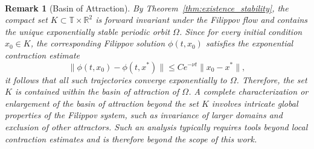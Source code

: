 \documentclass[11pt]{article}
\newtheorem{remark}{Remark}
\begin{document}
\

\begin{remark}[Basin of Attraction]\label{rem:basin_of_attraction}
By Theorem~\ref{thm:existence_stability}, the compact set \(K \subset \mathbb{T} \times \mathbb{R}^2\) is forward invariant under the Filippov flow and contains the unique exponentially stable periodic orbit \(\Omega\). Since for every initial condition \(x_0 \in K\), the corresponding Filippov solution \(\phi(t, x_0)\) satisfies the exponential contraction estimate
	\[
	\|\phi(t, x_0) - \phi(t, x^*)\| \leq C e^{-\nu t} \|x_0 - x^*\|,
	\]
it follows that all such trajectories converge exponentially to \(\Omega\). Therefore, the set \(K\) is contained within the basin of attraction of \(\Omega\). A complete characterization or enlargement of the basin of attraction beyond the set \(K\) involves intricate global properties of the Filippov system, such as invariance of larger domains and exclusion of other attractors. Such an analysis typically requires tools beyond local contraction estimates and is therefore beyond the scope of this work.
\end{remark}

\
\end{document}
